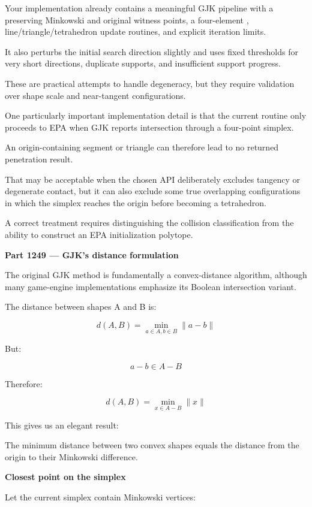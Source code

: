 Your implementation already contains a meaningful GJK pipeline with a  preserving Minkowski and original witness points, a four-element , line/triangle/tetrahedron update routines, and explicit iteration limits.

It also perturbs the initial search direction slightly and uses fixed thresholds for very short directions, duplicate supports, and insufficient support progress.

These are practical attempts to handle degeneracy, but they require validation over shape scale and near-tangent configurations.

One particularly important implementation detail is that the current routine only proceeds to EPA when GJK reports intersection through a four-point simplex.

An origin-containing segment or triangle can therefore lead to no returned penetration result.

That may be acceptable when the chosen API deliberately excludes tangency or degenerate contact, but it can also exclude some true overlapping configurations in which the simplex reaches the origin before becoming a tetrahedron.

A correct treatment requires distinguishing the collision classification from the ability to construct an EPA initialization polytope.

\textbf{Part 1249 --- GJK's distance formulation}

The original GJK method is fundamentally a convex-distance algorithm, although many game-engine implementations emphasize its Boolean intersection variant.

The distance between shapes A and B is:

\[
\boxed{ d(A,B)= \min_{a\in A,b\in B}\|a-b\| }
\]

But:

\[
a-b\in A-B
\]

Therefore:

\[
\boxed{ d(A,B)= \min_{x\in A-B}\|x\| }
\]

This gives us an elegant result:

The minimum distance between two convex shapes equals the distance from the origin to their Minkowski difference.

\textbf{Closest point on the simplex}

Let the current simplex contain Minkowski vertices:

